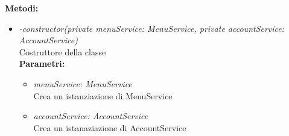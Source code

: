 	\item \textbf{Metodi:}
		\begin{itemize}
			\item \emph{-constructor(private menuService: MenuService,
    private accountService: AccountService)}\\
    		Costruttore della classe\\
    		\textbf{Parametri:}
    		\begin{itemize}
    			\item \emph{menuService: MenuService}\\
    			Crea un istanziazione di MenuService  			
    			\item \emph{accountService: AccountService}\\
    			Crea un istanaziazione di AccountService
    		\end{itemize}
\end{itemize}